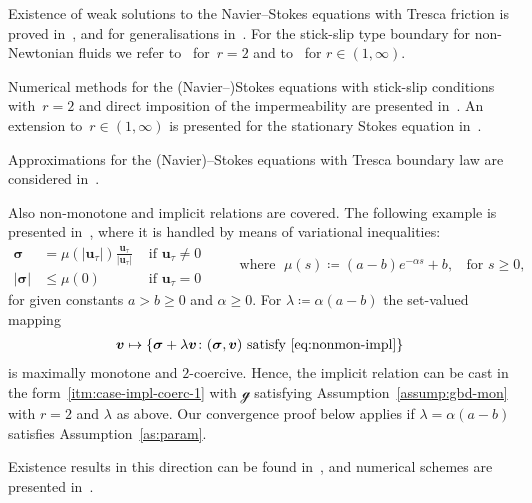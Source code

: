\documentclass[reqno,a4paper]{amsart}
\def\abs#1{\left| #1 \right|}
\def\vec#1{\boldsymbol{#1}}
\def\bu{\vec{u}}
\def\bv{\vec{v}}
\def\bsigma{\vec{\sigma}}
\def\gbd{\vec{\mathcal{g}}}
\begin{document}
\begin{example}
		Existence of weak solutions to the Navier--Stokes equations with Tresca friction is proved in~\cite{Fuj.1994,Fuj.2002}, and for generalisations in~\cite{LeRoux.2005, LeRoux2007}.  
		For the stick-slip type boundary for non-Newtonian fluids we refer to~\cite{BulicekMalek2016} for~$r = 2$ and to~\cite{BulicekMalekMaringova2023}  for $r \in (1,\infty)$. 
		
		Numerical methods for the (Navier--)Stokes equations  with stick-slip conditions with~$r = 2$ and direct imposition of the impermeability  are presented in~\cite{DM.2013,D.2014,DK.2016}. 
		An extension to~$r \in (1,\infty)$ is presented for the stationary Stokes equation in~\cite{HKSS.2018}. 
		
		Approximations for the (Navier)--Stokes equations  with Tresca boundary law are considered in~\cite{LL.2010, LA.2011, Kas.2013c, ABGS.2014,JHYW.2018,AABS.2019}. 
	\end{example}
	
	\begin{example}\label{ex:Fang} 
		Also non-monotone and implicit relations are covered. 
		The following example is presented in~\cite{Fang2020}, where it is handled by means of variational inequalities: 
		\begin{equation}\label{eq:nonmon-impl}
			\begin{array}{rlr}
				\bsigma &= \mu(\abs{\bu_\tau})\frac{\bu_\tau}{\abs{\bu_\tau}}  & \text{ if }\bu_\tau \neq 0  \\
				|\bsigma| &\leq \mu(0)  & \text{ if }\bu_\tau = 0
			\end{array}
			\qquad \text{ where }\;
			\mu(s) \coloneqq (a-b)e^{-\alpha s} + b, \;\; \text{ for } s \geq 0,
		\end{equation}
		for given constants $a > b \geq 0$ and $\alpha \geq 0$. 
		For $\lambda \coloneqq \alpha (a-b)$  the set-valued mapping 
		\begin{align*}
			\bv \mapsto \{\bsigma + \lambda \bv \colon  (\bsigma, \bv) \text{ satisfy \eqref{eq:nonmon-impl}} \}
		\end{align*}
		is maximally monotone and $2$-coercive. 
		Hence, the implicit relation can be cast in the form~\eqref{itm:case-impl-coerc-1} with $\gbd$ satisfying Assumption~\ref{assump:gbd-mon} with $r = 2$ and $\lambda$ as above. 
		Our convergence proof below applies if $\lambda = \alpha (a-b)$ satisfies Assumption~\ref{as:param}.
		
		Existence results in this direction can be found in~\cite{Fang2016,MP.2018,MD.2022}, and numerical schemes are presented in~\cite{Fang2020,HCJ.2021}. 			
	\end{example}
	
\end{document}
